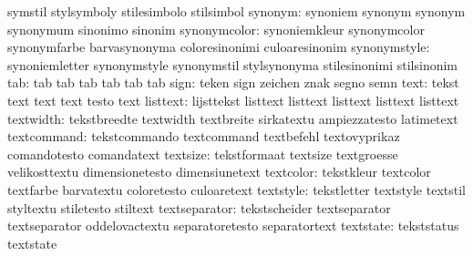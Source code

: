                            symstil                   stylsymboly
                           stilesimbolo              stilsimbol
                  synonym: synoniem                  synonym
                           synonym                   synonymum
                           sinonimo                  sinonim
             synonymcolor: synoniemkleur             synonymcolor
                           synonymfarbe              barvasynonyma
                           coloresinonimi            culoaresinonim
             synonymstyle: synoniemletter            synonymstyle
                           synonymstil               stylsynonyma
                           stilesinonimi             stilsinonim
                      tab: tab                       tab
                           tab                       tab
                           tab                       tab
                     sign: teken                     sign
                           zeichen                   znak
                           segno                     semn
                     text: tekst                     text
                           text                      text
                           testo                     text
                 listtext: lijsttekst                listtext
                           listtext                  listtext
                           listtext                  listtext
                textwidth: tekstbreedte              textwidth
                           textbreite                sirkatextu
                           ampiezzatesto             latimetext
              textcommand: tekstcommando             textcommand
                           textbefehl                textovyprikaz
                           comandotesto              comandatext
                 textsize: tekstformaat              textsize
                           textgroesse               velikosttextu
                           dimensionetesto           dimensiunetext
                textcolor: tekstkleur                textcolor
                           textfarbe                 barvatextu
                           coloretesto               culoaretext
                textstyle: tekstletter               textstyle
                           textstil                  styltextu
                           stiletesto                stiltext
            textseparator: tekstscheider             textseparator
                           textseparator             oddelovactextu
                           separatoretesto           separatortext
                textstate: tekststatus               textstate
